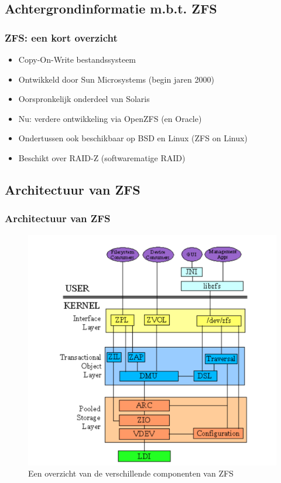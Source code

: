 \documentclass{beamer}
\begin{document}
\subsection{Achtergrondinformatie m.b.t. ZFS}


\begin{frame}
\frametitle{ZFS: een kort overzicht}
\begin{itemize}
  \item Copy-On-Write bestandssysteem
  \item Ontwikkeld door Sun Microsystems (begin jaren 2000) 
  \item Oorspronkelijk onderdeel van Solaris
  \item Nu: verdere ontwikkeling via OpenZFS (en Oracle)
  \item Ondertussen ook beschikbaar op BSD en Linux (ZFS on Linux)
  \item{Beschikt over RAID-Z (softwarematige RAID)}
\end{itemize}
\end{frame}


\subsection{Architectuur van ZFS}


\begin{frame}
\frametitle{Architectuur van ZFS}
  \begin{figure}
    \centering
    \includegraphics[width=0.63\linewidth]{img/h3-zfs_overview}
    \caption{Een overzicht van de verschillende componenten van ZFS \autocite{KendiOnbekend}}
    \label{fig:kendi_zfs_overview}
  \end{figure}
\end{frame}
\end{document}

